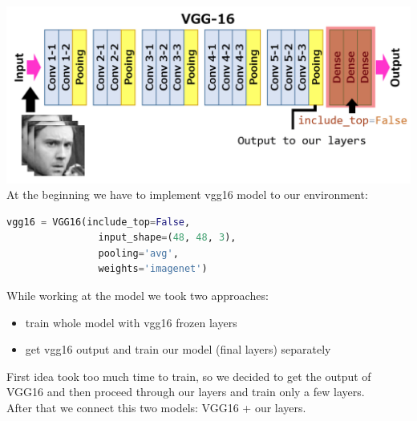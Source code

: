 \includegraphics[scale=0.5]{images/modelOne/vgg16layers.png}
At the beginning we have to implement vgg16 model to our environment:
\begin{lstlisting}[language=Python]
    vgg16 = VGG16(include_top=False,
                input_shape=(48, 48, 3),
                pooling='avg',
                weights='imagenet')
\end{lstlisting}

While working at the model we took two approaches:
\begin{itemize}
          \item train whole model with vgg16 frozen layers
          \item get vgg16 output and train our model (final layers) separately
\end{itemize}
First idea took too much time to train, so we decided to get the output of VGG16 and then proceed through our layers and train only a few layers.\\
After that we connect this two models:
VGG16 + our layers.


